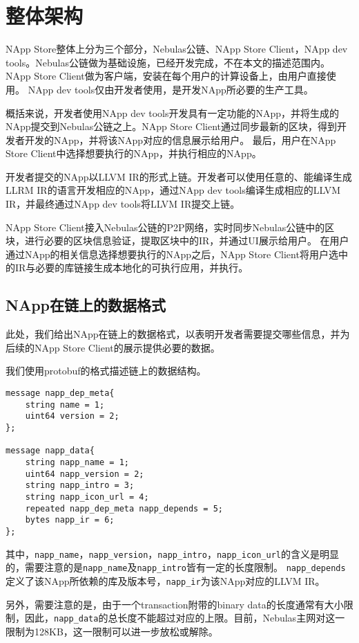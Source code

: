 \section{整体架构}

NApp Store整体上分为三个部分，Nebulas公链、NApp Store Client，NApp dev tools。Nebulas公链做为基础设施，已经开发完成，不在本文的描述范围内。NApp Store Client做为客户端，安装在每个用户的计算设备上，由用户直接使用。
NApp dev tools仅由开发者使用，是开发NApp所必要的生产工具。

概括来说，开发者使用NApp dev tools开发具有一定功能的NApp，并将生成的NApp提交到Nebulas公链之上。NApp Store Client通过同步最新的区块，得到开发者开发的NApp，并将该NApp对应的信息展示给用户。
最后，用户在NApp Store Client中选择想要执行的NApp，并执行相应的NApp。

开发者提交的NApp以LLVM IR的形式上链。开发者可以使用任意的、能编译生成LLRM IR的语言开发相应的NApp，通过NApp dev tools编译生成相应的LLVM IR，并最终通过NApp dev tools将LLVM IR提交上链。

NApp Store Client接入Nebulas公链的P2P网络，实时同步Nebulas公链中的区块，进行必要的区块信息验证，提取区块中的IR，并通过UI展示给用户。
在用户通过NApp的相关信息选择想要执行的NApp之后，NApp Store Client将用户选中的IR与必要的库链接生成本地化的可执行应用，并执行。

\subsection{NApp在链上的数据格式}
此处，我们给出NApp在链上的数据格式，以表明开发者需要提交哪些信息，并为后续的NApp Store Client的展示提供必要的数据。

我们使用protobuf的格式描述链上的数据结构。
\begin{verbatim}
message napp_dep_meta{
    string name = 1;
    uint64 version = 2;
};

message napp_data{
    string napp_name = 1;
    uint64 napp_version = 2;
    string napp_intro = 3;
    string napp_icon_url = 4;
    repeated napp_dep_meta napp_depends = 5;
    bytes napp_ir = 6;
};

\end{verbatim}
\noindent 其中，\texttt{napp\_name}，\texttt{napp\_version}，\texttt{napp\_intro}，\texttt{napp\_icon\_url}的含义是明显的，需要注意的是\texttt{napp\_name}及\texttt{napp\_intro}皆有一定的长度限制。
\texttt{napp\_depends}定义了该NApp所依赖的库及版本号，\texttt{napp\_ir}为该NApp对应的LLVM IR。

另外，需要注意的是，由于一个transaction附带的binary data的长度通常有大小限制，因此，\texttt{napp\_data}的总长度不能超过对应的上限。目前，Nebulas主网对这一限制为128KB，这一限制可以进一步放松或解除。

